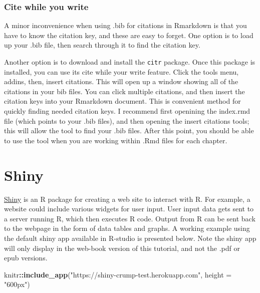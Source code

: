 \documentclass[
]{book}
\newenvironment{Shaded}{\begin{snugshade}}{\end{snugshade}}
\newcommand{\DataTypeTok}[1]{\textcolor[rgb]{0.13,0.29,0.53}{#1}}
\newcommand{\KeywordTok}[1]{\textcolor[rgb]{0.13,0.29,0.53}{\textbf{#1}}}
\newcommand{\NormalTok}[1]{#1}
\newcommand{\OperatorTok}[1]{\textcolor[rgb]{0.81,0.36,0.00}{\textbf{#1}}}
\newcommand{\StringTok}[1]{\textcolor[rgb]{0.31,0.60,0.02}{#1}}
\begin{document}
\hypertarget{cite-while-you-write}{%
\subsection{Cite while you write}\label{cite-while-you-write}}

A minor inconvenience when using .bib for citations in Rmarkdown is that you have to know the citation key, and these are easy to forget. One option is to load up your .bib file, then search through it to find the citation key.

Another option is to download and install the \texttt{citr} package. Once this package is installed, you can use its cite while your write feature. Click the tools menu, addins, then, insert citations. This will open up a window showing all of the citations in your bib files. You can click multiple citations, and then insert the citation keys into your Rmarkdown document. This is convenient method for quickly finding needed citation keys. I recommend first openining the index.rmd file (which points to your .bib files), and then opening the insert citations tools; this will allow the tool to find your .bib files. After this point, you should be able to use the tool when you are working within .Rmd files for each chapter.

\hypertarget{shiny}{%
\chapter{Shiny}\label{shiny}}

\href{https://shiny.rstudio.com}{Shiny} is an R package for creating a web site to interact with R. For example, a website could include various widgets for user input. User input data gets sent to a server running R, which then executes R code. Output from R can be sent back to the webpage in the form of data tables and graphs. A working example using the default shiny app available in R-studio is presented below. Note the shiny app will only display in the web-book version of this tutorial, and not the .pdf or epub versions.

\begin{Shaded}
\begin{Highlighting}[]
\NormalTok{knitr}\OperatorTok{::}\KeywordTok{include_app}\NormalTok{(}\StringTok{"https://shiny-crump-test.herokuapp.com"}\NormalTok{, }
  \DataTypeTok{height =} \StringTok{"600px"}\NormalTok{)}
\end{Highlighting}
\end{Shaded}
\end{document}

